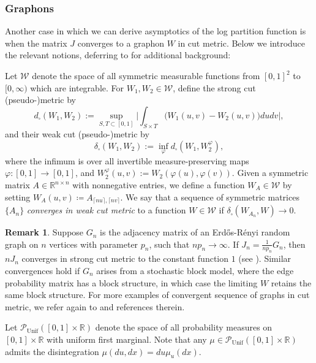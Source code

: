 \documentclass[11pt,reqno]{amsart}
\numberwithin{equation}{section}
\theoremstyle{definition}
\newtheorem{remark}[theorem]{Remark}
\def\R{{\mathbb R}}
\def\P{{\mathcal P}}
\def\Punif{\P_{\mathrm{Unif}}([0,1] \times \R)}
\begin{document}
\subsubsection{Graphons}

Another case in which we can derive asymptotics of the log partition function is when the matrix $J$ converges to a graphon $W$ in cut metric. Below we introduce the relevant notions, deferring to \cite{borgs-Lp-1,borgs-Lp-2,borgs2008convergent,lovasz2012large} for additional background:



\begin{definition}
	Let $\mathcal{W}$ denote the space of all symmetric measurable functions from $[0,1]^2$ to $[0, \infty)$ which are integrable. For $W_1,W_2\in \mathcal{W}$, define the  strong cut (pseudo-)metric by 
	\[
	d_\square(W_1,W_2):=\sup_{S,T\subset [0,1]}\bigg|\int_{S\times T} \big(W_1(u,v)-W_2(u,v) \big)du dv\bigg|,
	\]
	and their weak cut (pseudo-)metric by
		\[
	\delta_\square(W_1,W_2):=\inf_{\varphi}d_\square(W_1,W_2^\varphi),
	\]
	where the infimum is over all invertible measure-preserving maps $\varphi : [0,1] \to [0,1]$, and $W_2^\varphi(u,v) := W_2(\varphi(u),\varphi(v))$.
	Given a symmetric matrix $A\in \R^{n\times n}$ with nonnegative entries, we define a function $W_{A} \in \mathcal{W}$ by setting  $W_A(u,v) \coloneqq A_{\lceil nu \rceil, \lceil nv \rceil}$.
	We say that a sequence of symmetric matrices $\{A_n\}$ \emph{converges in weak cut metric} to a function $W \in \mathcal{W}$ if $\delta_\square(W_{A_n},W)\to 0$.
\end{definition}


\begin{remark}
	Suppose $G_n$ is the adjacency matrix of an Erd\H{o}s-R\'enyi random graph on $n$ vertices with parameter $p_n$, such that $np_n\to \infty$. If $J_n=\frac{1}{np_n}G_n$, then $nJ_n$ converges in strong cut metric to the constant function $1$ (see \cite[Example 3.3.1]{borgs-Lp-2}). Similar convergences hold if $G_n$ arises from a stochastic block model, where the edge probability matrix has a block structure, in which case the limiting $W$ retains the same block structure. For more examples of convergent sequence of graphs in cut metric, we refer again to \cite{borgs-Lp-1,borgs-Lp-2,borgs2008convergent,lovasz2012large} and references therein.
\end{remark}


Let $\Punif$ denote the space of all probability measures on $[0,1]\times \R$ with uniform first marginal. 
Note that any $\mu \in \Punif$ admits the disintegration $\mu(du,dx)=du\mu_u(dx)$.
\end{document}

